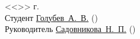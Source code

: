 \documentclass[a4paper, 14pt]{extreport}
\begin{document}
    \pagestyle{empty}
    \vspace{\fill}
    \noindent<<\underline{\hspace{1cm}}>> \underline{\hspace{5cm}} \the\year г.\\
    Студент \hspace{1cm} \underline{Голубев~А.~В.\hspace{3.2cm}} \hspace{2cm} (\underline{\hspace{5cm}})\\
    Руководитель \underline{Садовникова~Н.~П.\hspace{2.05cm}} \hspace{2cm} (\underline{\hspace{5cm}})\\
\end{document}
